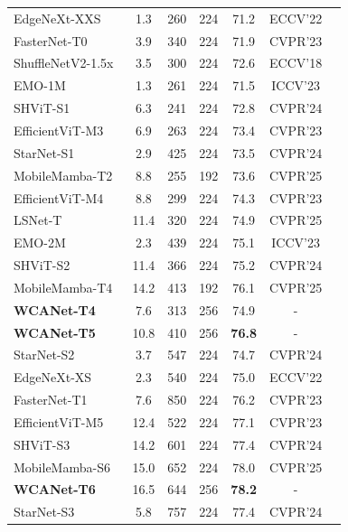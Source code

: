 \documentclass[a4paper,fleqn]{cas-dc}
\begin{document}
\begin{table} [pos=t]
\begin{tabular}{lcccccc}
\midrule
  EdgeNeXt-XXS~\cite{maaz2022edgenext} & 1.3 & 260 &224 &71.2 & ECCV'22 \\
  FasterNet-T0~\cite{chen2023run} & 3.9 & 340 & 224 & 71.9  & CVPR'23 \\
  ShuffleNetV2-1.5x~\cite{ma2018shufflenet} & 3.5 & 300 & 224 & 72.6 & ECCV'18 \\
  EMO-1M~\cite{zhang2023rethinking} & 1.3 & 261 & 224 & 71.5 & ICCV'23 \\
  SHViT-S1~\cite{yun2024shvit} & 6.3 & 241 & 224 & 72.8 & CVPR'24 \\
{EfficientViT-M3~\cite{liu2023efficientvit}} & 6.9 & 263 & 224 & 73.4 & CVPR'23\\
  StarNet-S1~\cite{ma2024rewrite} & 2.9 & 425 & 224 & 73.5 & CVPR'24 \\
  MobileMamba-T2~\cite{he2025mobilemamba} & 8.8 & 255 & 192 & 73.6 & CVPR'25 \\
  {EfficientViT-M4~\cite{liu2023efficientvit}} & 8.8 & 299 & 224 & 74.3 & CVPR'23\\
  LSNet-T~\cite{wang2025lsnet} & 11.4 & 320 & 224 & 74.9 & CVPR'25  \\
  EMO-2M~\cite{zhang2023rethinking} & 2.3 & 439 & 224 & 75.1 & ICCV'23 \\
  SHViT-S2~\cite{yun2024shvit} & 11.4 & 366 & 224 & 75.2 & CVPR'24 \\
  MobileMamba-T4~\cite{he2025mobilemamba} & 14.2 & 413 & 192 & 76.1 & CVPR'25 \\
  \rowcolor[gray]{0.92}
\textbf{WCANet-T4} & 7.6 & 313 & 256 & 74.9 & - \\
  \rowcolor[gray]{0.92}
\textbf{WCANet-T5} & 10.8 & 410 & 256 & \textbf{76.8} & - \\
  \midrule
  StarNet-S2~\cite{ma2024rewrite} & 3.7 & 547 & 224 & 74.7 & CVPR'24 \\
EdgeNeXt-XS~\cite{maaz2022edgenext} & 2.3 & 540 & 224 & 75.0 & ECCV'22\\
FasterNet-T1~\cite{chen2023run} & 7.6 & 850 & 224 & 76.2  & CVPR'23 \\
{EfficientViT-M5~\cite{liu2023efficientvit}} & 12.4 & 522 & 224 & 77.1 & CVPR'23\\
SHViT-S3~\cite{yun2024shvit} & 14.2 & 601 & 224 & 77.4 & CVPR'24 \\
MobileMamba-S6~\cite{he2025mobilemamba} & 15.0 & 652 & 224 & 78.0 & CVPR'25 \\
\rowcolor[gray]{0.92}
\textbf{WCANet-T6} & 16.5 & 644 & 256 & \textbf{78.2} & - \\
  \midrule
StarNet-S3~\cite{ma2024rewrite} & 5.8 & 757 & 224 & 77.4 & CVPR'24 \\

\end{tabular}
\end{table}
\end{document}
